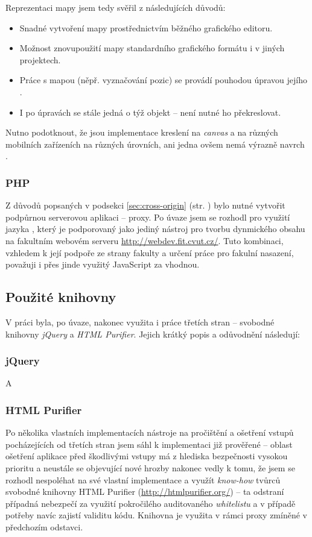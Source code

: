 Reprezentaci mapy jsem tedy svěřil  z následujících důvodů:
\begin{itemize}
 \item Snadné vytvoření mapy prostřednictvím běžného grafického editoru.
 \item Možnost znovupoužití mapy standardního grafického formátu i v jiných projektech.
 \item Práce s mapou (něpř. vyznačování pozic) se provádí pouhodou úpravou jejího .
 \item I po úpravách se stále jedná o týž objekt -- není nutné ho překreslovat.
\end{itemize}

Nutno podotknout, že jsou implementace kreslení na \textit{canvas} a  na různých mobilních zařízeních na různých úrovních, ani jedna ovšem nemá výrazně navrch \cite{CanIUse} \cite{MobileHtml}.

\subsubsection{PHP}
Z důvodů popsaných v podsekci \ref{sec:cross-origin} (str. \pageref{sec:cross-origin}) bylo nutné vytvořit podpůrnou serverovou aplikaci -- proxy. Po úvaze jsem se rozhodl pro využití jazyka , který je podporovaný jako jediný nástroj pro tvorbu dynmického obsahu na fakultním webovém serveru \url{http://webdev.fit.cvut.cz/}. Tuto kombinaci, vzhledem k její podpoře ze strany fakulty a určení práce pro fakulní nasazení, považuji i přes jinde využitý JavaScript za vhodnou.


\subsection{Použité knihovny}
V práci byla, po úvaze, nakonec využita i práce třetích stran -- svobodné knihovny \emph{jQuery} a \emph{HTML Purifier}. Jejich krátký popis a odůvodnění následují:

\subsubsection{jQuery}
A

\subsubsection{HTML Purifier}
Po několika vlastních implementacích nástroje na pročištění a ošetření  vstupů pocházejících od třetích stran jsem sáhl k implementaci již prověřené -- oblast ošetření aplikace před škodlivými vstupy má z hlediska bezpečnosti vysokou prioritu a neustále se objevující nové hrozby nakonec vedly k tomu, že jsem se rozhodl nespoléhat na své vlastní implementace a využít \textit{know-how} tvůrců svobodné  knihovny  HTML Purifier (\url{http://htmlpurifier.org/}) -- ta odstraní případná nebezpečí za využití pokročilého auditovaného \textit{whitelistu} a v případě potřeby navíc zajistí validitu kódu. Knihovna je využita v rámci proxy zmíněné v předchozím odstavci.


